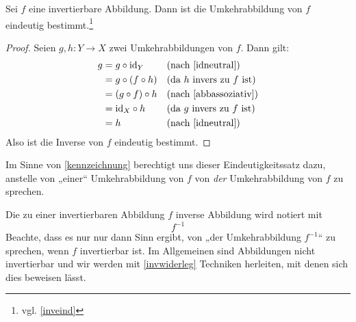 \begin{satz}\label{umkehreind}
    Sei $f$ eine invertierbare Abbildung. Dann ist die Umkehrabbildung von $f$ eindeutig bestimmt.\footnote{vgl. \cref{inveind}}
\end{satz}
\begin{proof}
    Seien $g,h:Y\to X$ zwei Umkehrabbildungen von $f$. Dann gilt:
    \begin{align*}
        g & = g\circ \id_Y && (\text{nach \cref{idneutral}})\\
        & = g\circ (f\circ h) && (\text{da $h$ invers zu $f$ ist}) \\
        & = (g\circ f)\circ h && (\text{nach \cref{abbassoziativ}}) \\
        & = \id_X \circ h && (\text{da $g$ invers zu $f$ ist}) \\
        & = h && (\text{nach \cref{idneutral}}) 
    \end{align*}
    Also ist die Inverse von $f$ eindeutig bestimmt.
\end{proof}


\begin{bem} \label{dieumkehrabb}
    Im Sinne von \cref{kennzeichnung} berechtigt uns dieser Eindeutigkeitssatz dazu, anstelle von „einer“ Umkehrabbildung von $f$ von \emph{der} Umkehrabbildung von $f$ zu sprechen.
    
    Die zu einer invertierbaren Abbildung $f$ inverse Abbildung wird notiert mit
        \[ f^{-1} \]
    Beachte, dass es nur nur dann Sinn ergibt, von „der Umkehrabbildung $f^{-1}$“ zu sprechen, wenn $f$ invertierbar ist. Im Allgemeinen sind Abbildungen nicht invertierbar und wir werden mit \cref{invwiderleg} Techniken herleiten, mit denen sich dies beweisen lässt.
\end{bem}


